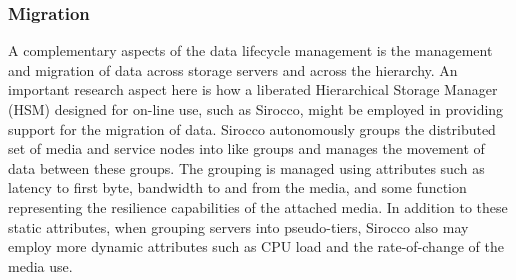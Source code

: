 
\subsubsection{Migration}
\label{sec:migration}
A complementary aspects of the data lifecycle management is the management and 
migration of data across storage servers and across the hierarchy. 
An important research aspect here is how a liberated Hierarchical Storage
Manager (HSM) designed for on-line use, such as Sirocco, might be employed in
providing support for the migration of data. Sirocco autonomously groups the
distributed set of media and service nodes into like groups and manages the
movement of data between these groups. The grouping is managed using
attributes such as latency to first byte, bandwidth to and from the media, and
some function representing the resilience capabilities of the attached media.
In addition to these static attributes, when grouping servers into
pseudo-tiers, Sirocco also may employ more dynamic attributes such as CPU load
and the rate-of-change of the media use. 

